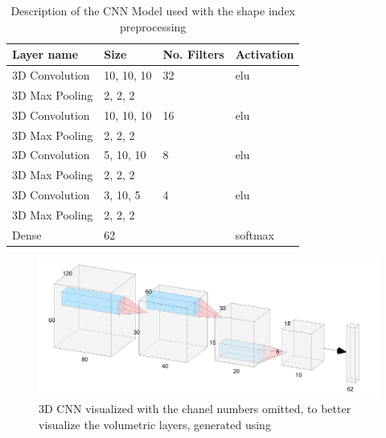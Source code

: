 \documentclass[12pt]{article}
\theoremstyle{definition}
\begin{document}
	\begin{table}[h]
		\centering
		\renewcommand{\arraystretch}{1.5}

		\caption{Description of the CNN Model used with the shape index preprocessing}
		\label{table:preprocessing-CNN}

		\begin{tabularx}{\textwidth}{XXXX}
			\textbf{Layer name} & \textbf{Size} & \textbf{No. Filters} & \textbf{Activation} \\ \hline
			3D Convolution & 10, 10, 10 & 32                   & elu                  \\ \hline
			3D Max Pooling & 2, 2, 2    & \textbf{\textendash} & \textbf{\textendash} \\ \hline
			3D Convolution & 10, 10, 10 & 16                   & elu                  \\ \hline
			3D Max Pooling & 2, 2, 2    & \textbf{\textendash} & \textbf{\textendash} \\ \hline
			3D Convolution & 5, 10, 10  & 8                    & elu                  \\ \hline
			3D Max Pooling & 2, 2, 2    & \textbf{\textendash} & \textbf{\textendash} \\ \hline
			3D Convolution & 3, 10, 5   & 4                    & elu                  \\ \hline
			3D Max Pooling & 2, 2, 2    & \textbf{\textendash} & \textbf{\textendash} \\ \hline
			Dense       & 62         & \textbf{\textendash} & softmax              \\
		\end{tabularx}
	\end{table}

	\begin{figure}
		\includegraphics[width=\textwidth]{networks/3D-CNN.png}
		\caption{3D CNN visualized with the chanel numbers omitted, to better visualize the volumetric layers, generated using \cite{nn-svg}}
		\label{figure:3D-CNN}
	\end{figure}
\end{document}
